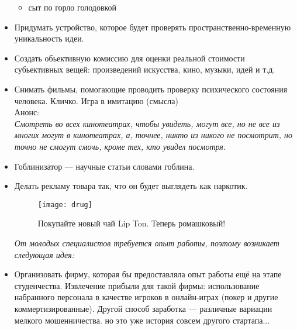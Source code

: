 \begin{itemize}
\begin{itemize}
            \item сыт по горло голодовкой
        \end{itemize}
    \item Придумать устройство, которое будет проверять пространственно-временную уникальность идеи.
    \item Создать обьективную комиссию для оценки реальной стоимости субьективных вещей: произведений искусства, кино, музыки, идей и т.д.
    \item Снимать фильмы, помогающие проводить проверку психического состояния человека.
    Кличко. Игра в имитацию (смысла) \\
    Анонс:\\
    \emph{Смотреть во всех кинотеатрах, чтобы увидеть, могут все, но не все из многих могут в кинотеатрах, а, точнее, никто из никого не посмотрит, но точно не смогут смочь, кроме тех, кто увидел посмотря.}
    \item Гоблинизатор --- научные статьи словами гоблина.
    \item Делать рекламу товара так, что он будет выглядеть как наркотик.

    \begin{figure}[ht!]
        \centering
        \texttt{[image: drug]}
        \caption{Покупайте новый чай Lip Ton. Теперь ромашковый!}
    \end{figure}

    \emph{От молодых специалистов требуется опыт работы, поэтому возникает следующая идея:}
    \item Организовать фирму, которая бы предоставляла опыт работы ещё на этапе студенчества. Извлечение прибыли для такой фирмы: использование набранного персонала в качестве игроков в онлайн-играх (покер и другие коммертизированные). Другой способ заработка --- различные вариации мелкого мошенничества. но это уже история совсем другого стартапа... 
\end{itemize}
